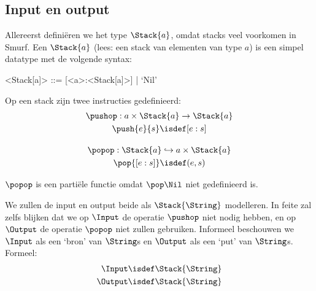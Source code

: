 \subsection{Input en output}
\label{sec:def:io}

Allereerst definiëren we het type $\Stack{a}$, omdat stacks veel voorkomen in
Smurf. Een $\Stack{a}$ (lees: een stack van elementen van type $a$) is een
simpel datatype met de volgende syntax:

\begin{grammar}
	<Stack[a]> ::= [<a>:<Stack[a]>] | `Nil'
\end{grammar}

Op een stack zijn twee instructies gedefinieerd:
\begin{gather*}
	\pushop : a \times \Stack{a} \to \Stack{a} \\
	\push{e}{s} \isdef [e:s] \\[1em]
	\popop : \Stack{a} \hookrightarrow a \times \Stack{a} \\
	\pop{[e:s]} \isdef (e,s) \\
\end{gather*}

$\popop$ is een partiële functie omdat $\pop\Nil$ niet gedefinieerd is.

\medskip
We zullen de input en output beide als $\Stack{\String}$ modelleren. In feite
zal zelfs blijken dat we op $\Input$ de operatie $\pushop$ niet nodig hebben,
en op $\Output$ de operatie $\popop$ niet zullen gebruiken. Informeel
beschouwen we $\Input$ als een `bron' van $\String$s en $\Output$ als een `put'
van $\String$s. Formeel:
\begin{align*}
	\Input &\isdef \Stack{\String} \\ \Output &\isdef \Stack{\String}
\end{align*}

